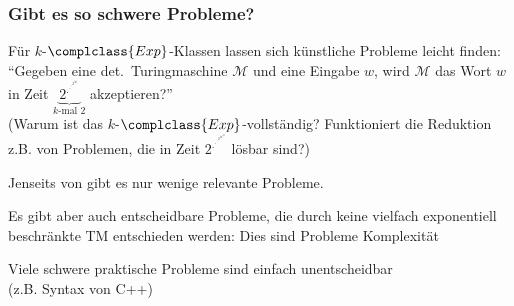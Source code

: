\documentclass[aspectratio=1610,onlymath]{beamer}
\begin{document}
\begin{frame}\frametitle{Gibt es so schwere Probleme?}\pause

Für $k$-$\complclass{Exp}$-Klassen lassen sich künstliche Probleme leicht finden: %
"`Gegeben eine det.\ Turingmaschine $\mathcal{M}$ und eine Eingabe $w$, wird $\mathcal{M}$ das Wort $w$ in Zeit $\underbrace{2^{.^{.^{.^{2^{|w|}}}}}}_{k\text{-mal 2}}$ akzeptieren?"'\\[-1ex]
{\tiny (Warum ist das $k$-$\complclass{Exp}$-vollständig? Funktioniert die Reduktion z.B. von Problemen, die in Zeit $2^{.^{.^{.^{2^{|w|^{42}}}}}}\!\!\!\!$ lösbar sind?)}
\bigskip\pause

Jenseits von \ExpSpace gibt es nur wenige relevante Probleme.\medskip

\pause

Es gibt aber auch entscheidbare Probleme, die durch keine vielfach exponentiell 
beschränkte TM entschieden werden: Dies sind Probleme 
Komplexität\medskip

\pause

Viele schwere praktische Probleme sind einfach unentscheidbar\\[-1ex]
{\tiny (z.B. Syntax von C++)}

\end{frame}
\end{document}
